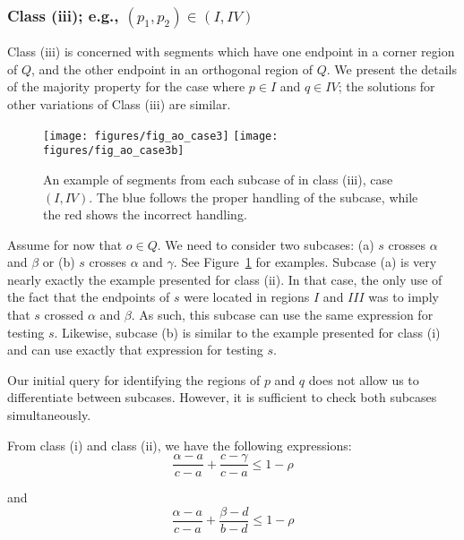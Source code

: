 \subsubsection*{Class (iii); e.g., $(p_1, p_2) \in (I, IV)$}
\label{:rectanges:ao:class3}

Class (iii) is concerned with segments which have one endpoint in a corner region of $Q$, and the other endpoint in an orthogonal region of $Q$. We present the details of the majority property for the case where $p \in I$ and $q \in IV$; the solutions for other variations of Class (iii) are similar.

\begin{figure}[t]
\begin{center}
  \texttt{[image: figures/fig\_ao\_case3]}
  \hspace{1.0em}
  \texttt{[image: figures/fig\_ao\_case3b]}
  \caption[An example of a segment in class (iii), case $(I, IV)$.]{An example of segments from each subcase of in class (iii), case $(I, IV)$. The blue follows the proper handling of the subcase, while the red shows the incorrect handling.}
  \label{fig:rectangles:ao:case3}
\end{center}
\end{figure}

Assume for now that $o \in Q$. We need to consider two subcases: (a) $s$ crosses $\alpha$ and $\beta$ or (b) $s$ crosses $\alpha$ and $\gamma$. See Figure~\ref{fig:rectangles:ao:case3} for examples. Subcase (a) is very nearly exactly the example presented for class (ii). In that case, the only use of the fact that the endpoints of $s$ were located in regions $I$ and $III$ was to imply that $s$ crossed $\alpha$ and $\beta$. As such, this subcase can use the same expression for testing $s$. Likewise, subcase (b) is similar to the example presented for class (i) and can use exactly that expression for testing $s$.

Our initial query for identifying the regions of $p$ and $q$ does not allow us to differentiate between subcases. However, it is sufficient to check both subcases simultaneously.

From class (i) and class (ii), we have the following expressions:
\[ 
\frac{\alpha - a}{c - a} + \frac{c - \gamma}{c - a} \leq 1 - \rho
\]

\noindent and
\[ 
\frac{\alpha - a}{c - a} + \frac{\beta - d}{b - d} \leq 1 - \rho
\]

